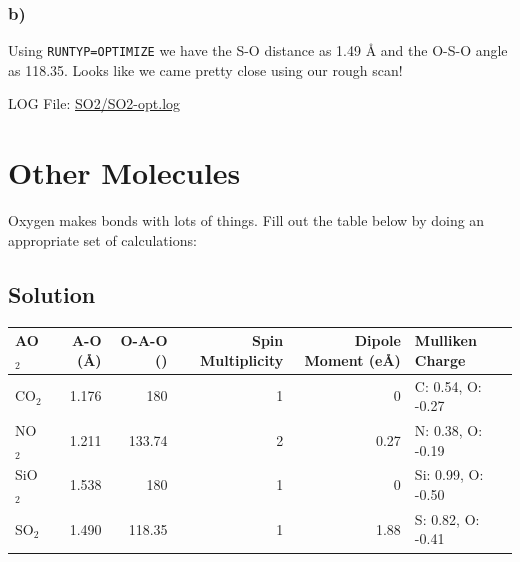 \documentclass[11pt]{article}
\begin{document}
\subsubsection{b)}
\label{sec-3-1-2}

Using \verb~RUNTYP=OPTIMIZE~ we have the S-O distance as 1.49 \AA{} and the O-S-O angle as 118.35\textdegree{}. Looks like we came pretty close using our rough scan!

LOG File: \url{SO2/SO2-opt.log}

\section{Other Molecules}
\label{sec-4}

Oxygen makes bonds with lots of things. Fill out the table below by doing an appropriate set of calculations:

\subsection{Solution}
\label{sec-4-1}
\begin{center}
\begin{tabular}{lrrrrl}
AO$_{\text{2}}$ & A-O (\AA{}) & O-A-O (\textdegree{}) & Spin Multiplicity & Dipole Moment (e\AA{}) & Mulliken Charge\\
\hline
CO$_{\text{2}}$ & 1.176 & 180 & 1 & 0 & C: 0.54, O: -0.27\\
NO$_{\text{2}}$ & 1.211 & 133.74 & 2 & 0.27 & N: 0.38, O: -0.19\\
SiO$_{\text{2}}$ & 1.538 & 180 & 1 & 0 & Si: 0.99, O: -0.50\\
SO$_{\text{2}}$ & 1.490 & 118.35 & 1 & 1.88 & S: 0.82, O: -0.41\\
\end{tabular}
\end{center}
\end{document}
